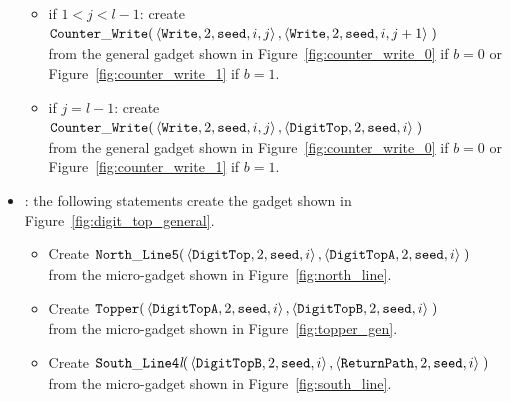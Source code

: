 \begin{itemize}
\begin{itemize}
        \item if $1 < j < l-1$: create
        $\begin{aligned}[t]
            {\tt Counter\_Write}(&\left\langle {\tt Write}, 2, {\tt seed}, i, j \right\rangle, \left\langle {\tt Write}, 2, {\tt seed}, i, j + 1 \right\rangle \;)
        \end{aligned}$\\from the general gadget shown in Figure~\ref{fig:counter_write_0} if $b = 0$ or Figure~\ref{fig:counter_write_1} if $b = 1$.

        \item if $j = l-1$: create
        $\begin{aligned}[t]
            {\tt Counter\_Write}(&\left\langle {\tt Write}, 2, {\tt seed}, i, j \right\rangle, \left\langle {\tt DigitTop}, 2, {\tt seed}, i \right\rangle \;)
        \end{aligned}$\\from the general gadget shown in Figure~\ref{fig:counter_write_0} if $b = 0$ or Figure~\ref{fig:counter_write_1} if $b = 1$.
    \end{itemize}


    \item {\dtop}: the following statements create the gadget shown in Figure~\ref{fig:digit_top_general}.
    \begin{itemize}
        \item Create
        $\begin{aligned}[t]
            {\tt North\_Line5}(& \left \langle {\tt DigitTop},  2, {\tt seed} , i \right\rangle,
                                 \left \langle {\tt DigitTopA}, 2, {\tt seed} , i \right\rangle \;)
        \end{aligned}$\\ from the micro-gadget shown in Figure~\ref{fig:north_line}.

        \item Create
        $\begin{aligned}[t]
            {\tt Topper}(& \left \langle {\tt DigitTopA}, 2, {\tt seed}, i \right\rangle,
                           \left \langle {\tt DigitTopB}, 2, {\tt seed}, i \right\rangle \;)
        \end{aligned}$\\ from the micro-gadget shown in Figure~\ref{fig:topper_gen}.

        \item Create
        $\begin{aligned}[t]
            {\tt South\_Line4\textit{l}}(&\left\langle {\tt DigitTopB}, 2, {\tt seed}, i \right\rangle,
                                          \left\langle {\tt ReturnPath},     2, {\tt seed}, i \right\rangle \;)
        \end{aligned}$\\ from the micro-gadget shown in Figure~\ref{fig:south_line}.
    \end{itemize}



\end{itemize}
